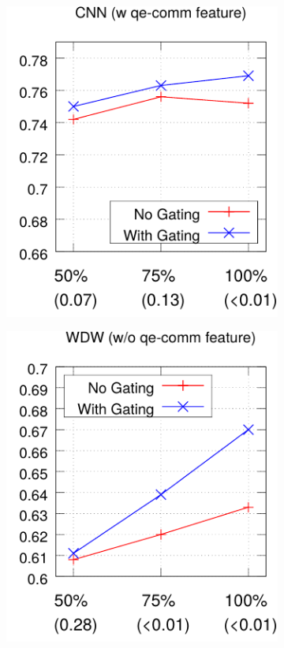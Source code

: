 \documentclass[11pt,a4paper]{article}
\begin{document}
\begin{figure}[ht]
\begin{subfigure}[b]{0.245\textwidth}
        \includegraphics[width=1.0\linewidth]{figures/cnn-feat1-crop}
        \label{fig:cnn_w_f}
    \end{subfigure}
        \begin{subfigure}[b]{0.245\textwidth}
    \includegraphics[width=1.0\linewidth]{figures/wdw-feat0-crop}

\end{subfigure}
\end{figure}
\end{document}
